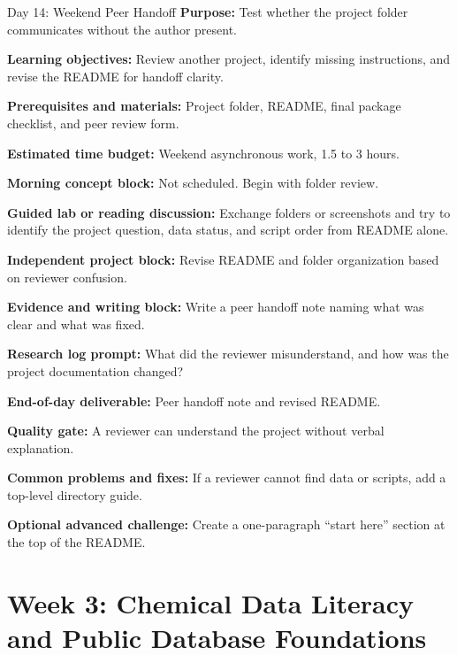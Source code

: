 \begin{dailybox}{Day 14: Weekend Peer Handoff}
\textbf{Purpose:} Test whether the project folder communicates without the author present.

\textbf{Learning objectives:} Review another project, identify missing instructions, and revise the README for handoff clarity.

\textbf{Prerequisites and materials:} Project folder, README, final package checklist, and peer review form.

\textbf{Estimated time budget:} Weekend asynchronous work, 1.5 to 3 hours.

\textbf{Morning concept block:} Not scheduled. Begin with folder review.

\textbf{Guided lab or reading discussion:} Exchange folders or screenshots and try to identify the project question, data status, and script order from README alone.

\textbf{Independent project block:} Revise README and folder organization based on reviewer confusion.

\textbf{Evidence and writing block:} Write a peer handoff note naming what was clear and what was fixed.

\textbf{Research log prompt:} What did the reviewer misunderstand, and how was the project documentation changed?

\textbf{End-of-day deliverable:} Peer handoff note and revised README.

\textbf{Quality gate:} A reviewer can understand the project without verbal explanation.

\textbf{Common problems and fixes:} If a reviewer cannot find data or scripts, add a top-level directory guide.

\textbf{Optional advanced challenge:} Create a one-paragraph ``start here'' section at the top of the README.
\end{dailybox}

\section{Week 3: Chemical Data Literacy and Public Database Foundations}

